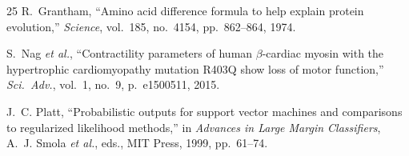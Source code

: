 \documentclass[conference]{IEEEtran}
\begin{document}
\begin{thebibliography}{25}
R.~Grantham,
``Amino acid difference formula to help explain protein evolution,''
\textit{Science}, vol.~185, no.~4154, pp.~862--864, 1974.

S.~Nag \textit{et al.},
``Contractility parameters of human $\beta$-cardiac myosin
with the hypertrophic cardiomyopathy mutation R403Q show loss of
motor function,''
\textit{Sci.\ Adv.}, vol.~1, no.~9, p.~e1500511, 2015.

J.~C. Platt,
``Probabilistic outputs for support vector machines and comparisons
to regularized likelihood methods,''
in \textit{Advances in Large Margin Classifiers},
A.~J. Smola \textit{et al.}, eds., MIT Press, 1999, pp.~61--74.

\end{thebibliography}
\end{document}
